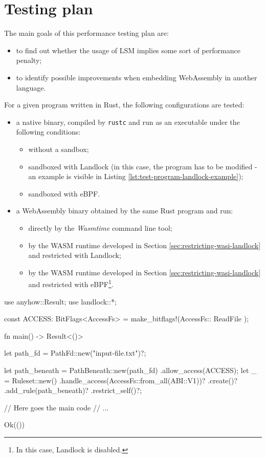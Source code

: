 \section{Testing plan}

The main goals of this performance testing plan are:
\begin{itemize}
  \item to find out whether the usage of LSM implies some sort of performance penalty;
  \item to identify possible improvements when embedding WebAssembly in another language.
\end{itemize}

\noindent
For a given program written in Rust, the following configurations are tested:
\begin{itemize}
  \item a native binary, compiled by \texttt{rustc} and run as an executable under the following conditions:
        \begin{itemize}
          \item without a sandbox;
          \item sandboxed with Landlock (in this case, the program has to be modified - an example is visible in Listing \ref{lst:test-program-landlock-example});
          \item sandboxed with eBPF.
        \end{itemize}
  \item a WebAssembly binary obtained by the same Rust program and run:
        \begin{itemize}
          \item directly by the \textit{Wasmtime} command line tool;
          \item by the WASM runtime developed in Section \ref{sec:restricting-wasi-landlock} and restricted with Landlock;
          \item by the WASM runtime developed in Section \ref{sec:restricting-wasi-landlock} and restricted with
                eBPF\footnote{In this case, Landlock is disabled.}.
        \end{itemize}
\end{itemize}

\vspace*{0.5cm}
\begin{code}[language=Rust, caption=An example of a program restricted with Landlock., label=lst:test-program-landlock-example]
use anyhow::Result;
use landlock::*;

const ACCESS: BitFlags<AccessFs> =
  make_bitflags!(AccessFs::{ ReadFile });

fn main() -> Result<()> {
    let path_fd = PathFd::new("input-file.txt")?;
    
    let path_beneath = PathBeneath::new(path_fd)
      .allow_access(ACCESS);
    let _ = Ruleset::new()
        .handle_access(AccessFs::from_all(ABI::V1))?
        .create()?
        .add_rule(path_beneath)?
        .restrict_self()?;

    // Here goes the main code
    // ...

    Ok(())
}
\end{code}

